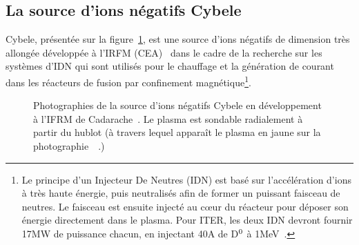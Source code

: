 \begin{refsection}
\subsection{La source d'ions négatifs Cybele}

Cybele, présentée sur la figure~\ref{4-cybelePhoto}, est une
source d'ions négatifs de dimension très allongée développée à l'IRFM
(CEA)~\cite{Simonin} dans le cadre de la recherche sur les systèmes d'IDN qui sont utilisés pour le chauffage et la génération de
courant dans les réacteurs de fusion par confinement magnétique\footnote{Le
principe d'un Injecteur De Neutres (IDN) est basé sur l'accélération d'ions à
très haute énergie, puis neutralisés afin de former un puissant faisceau de neutres.
Le faisceau est ensuite injecté au c\oe{}ur du réacteur pour déposer son énergie
directement dans le plasma. Pour ITER, les deux IDN devront fournir 17MW de
puissance chacun, en injectant 40A de D$^{{0}}$ à
1MeV~\parencite{Hemsworth}.}.

\begin{figure}[!htbp]
  \centering
    \caption{Photographies de la source d'ions négatifs Cybele en développement
    à l'IFRM de Cadarache~\parencite{SimoninHDR}. Le plasma est
    sondable radialement à partir du hublot (à travers lequel apparaît le
    plasma en jaune sur la photographie~~.)
    \label{4-cybelePhoto}} 
\end{figure}	


\end{refsection}
